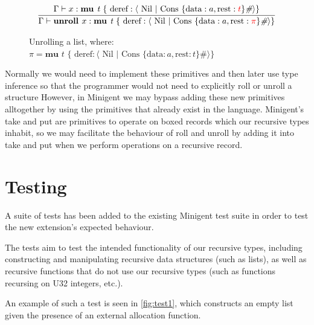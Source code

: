 \begin{figure}
    \centering
    \begin{align*}
        \infer{
            \Gamma \vdash \textbf{unroll } x : \textbf{mu } \textit{t } \{ \text{ deref}: \langle \text{ Nil } \vert \text{ Cons } \{ \text{data}: a, \text{rest}: {\color{red} \pi}  \}\textit{\#} \rangle \} 
        }{
            \Gamma \vdash x : \textbf{mu } \textit{t } \{ \text{ deref}: \langle \text{ Nil } \vert \text{ Cons } \{ \text{data}: a, \text{rest}: {\color{red} t} \}\textit{\#} \rangle \} 
        }
    \end{align*}
    \caption{Unrolling a list, where: \newline \protect\phantom{Figure x.x:} $\pi = \textbf{mu } \textit{t } \{ \text{ deref}: \langle \text{ Nil } \vert \text{ Cons } \{ \text{data}: a, \text{rest}: t \}\textit{\#} \rangle \}$}
    \label{fig:unrollexample}
\end{figure}

Normally we would need to implement these primitives and then later use type inference so that
the programmer would not need to explicitly roll or unroll a structure However,
in Minigent we may bypass adding these new primitives alltogether by using the primitives
that already exist in the language. Minigent's \textsf{take} and \textsf{put} are primitives to
operate on boxed records which our recursive types inhabit, so we may facilitate the behaviour
of roll and unroll by adding it into take and put when we perform operations on a recursive record.


\section{Testing}


A suite of tests has been added to the existing Minigent test suite in order to test the new extension's 
expected behaviour.

The tests aim to test the intended functionality of our recursive types, including constructing and manipulating
recursive data structures (such as lists), as well as recursive functions that do not use our recursive types 
(such as functions recursing on U32 integers, etc.).

An example of such a test is seen in \autoref{fig:test1}, which constructs an empty list given the presence
of an external allocation function.


